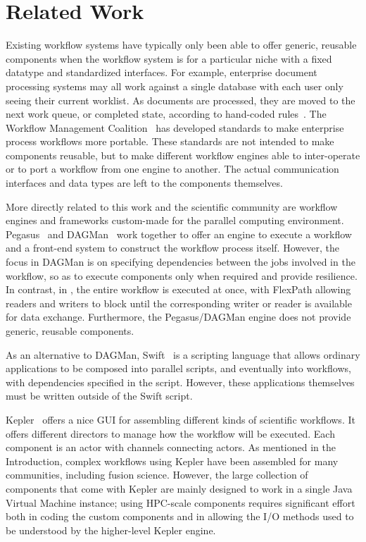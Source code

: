 \section{Related Work}
\label{s:related}

Existing workflow systems have typically only been able to offer generic,
reusable components when the workflow system is for a particular niche with a
fixed datatype and standardized interfaces. For example, enterprise document
processing systems may all work against a single database with each user only
seeing their current worklist. As documents are processed, they are moved to
the next work queue, or completed state, according to hand-coded
rules~\cite{mckesson-workflow}. The Workflow Management Coalition~\cite{wfmc}
has developed standards to make enterprise process workflows more portable.
These standards are not intended to make components reusable, but to make
different workflow engines able to inter-operate or to port a workflow from one
engine to another.  The actual communication interfaces and data types are left
to the components themselves.

More directly related to this work and the scientific community are workflow
engines and frameworks custom-made for the parallel computing environment.
Pegasus~\cite{mullender:pegasus} and DAGMan~\cite{Malewicz:2006:dagman} work
together to offer an engine to execute a workflow and a front-end system to
construct the workflow process itself.
However, the focus in DAGMan is on specifying dependencies between
the jobs involved in the workflow, so as to execute
components only when required and provide resilience.
In contrast, in \sys, the entire workflow is executed at once, with
FlexPath allowing readers and writers to block until
the corresponding writer or reader is available for data exchange.
Furthermore, the Pegasus/DAGMan engine does not provide
generic, reusable components.

As an alternative to DAGMan, Swift~\cite{wilde2011swift}
is a scripting language that allows ordinary applications
to be composed into parallel scripts, and eventually into
workflows, with dependencies specified in the script.
However, these applications themselves
must be written outside of the Swift script.

Kepler~\cite{bertram:2006:kepler} offers a nice GUI for assembling different
kinds of scientific workflows. It offers different directors to manage how the
workflow will be executed. Each component is an actor with channels connecting
actors. As mentioned in the Introduction, complex workflows using Kepler have been
assembled for many communities, including fusion science.
However, the large collection of components
that come with Kepler are mainly designed
to work in a single Java Virtual Machine instance;
using HPC-scale components requires significant effort
both in coding the custom components and in
allowing the I/O methods used to be understood by the
higher-level
Kepler engine.

